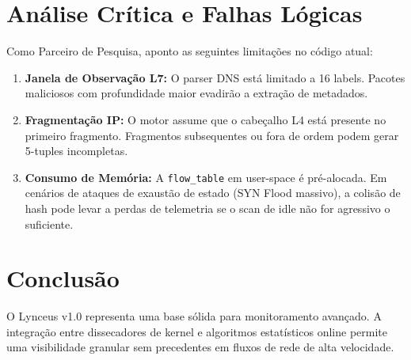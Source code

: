 \documentclass[a4paper,12pt]{article}
\begin{document}
\section{Análise Crítica e Falhas Lógicas}
Como Parceiro de Pesquisa, aponto as seguintes limitações no código atual:
\begin{enumerate}
    \item \textbf{Janela de Observação L7:} O parser DNS está limitado a 16 labels. Pacotes maliciosos com profundidade maior evadirão a extração de metadados.
    \item \textbf{Fragmentação IP:} O motor assume que o cabeçalho L4 está presente no primeiro fragmento. Fragmentos subsequentes ou fora de ordem podem gerar 5-tuples incompletas.
    \item \textbf{Consumo de Memória:} A \texttt{flow\_table} em user-space é pré-alocada. Em cenários de ataques de exaustão de estado (SYN Flood massivo), a colisão de hash pode levar a perdas de telemetria se o scan de idle não for agressivo o suficiente.
\end{enumerate}

\section{Conclusão}
O Lynceus v1.0 representa uma base sólida para monitoramento avançado. A integração entre dissecadores de kernel e algoritmos estatísticos online permite uma visibilidade granular sem precedentes em fluxos de rede de alta velocidade.
\end{document}
